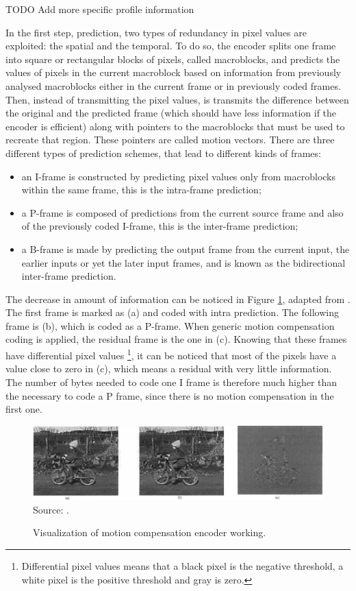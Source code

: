 \documentclass[
	12pt,				%
	openright,			%
	twoside,			%
	a4paper,			%
	brazil,
	french,				%
	english
	]{abntex2}
\begin{document}
TODO Add more specific profile information

In the first step, prediction, two types of redundancy in pixel values are exploited: the spatial and the temporal. To do so, the encoder splits one frame into square or rectangular blocks of pixels, called macroblocks, and predicts the values of pixels in the current macroblock based on information from previously analysed macroblocks either in the current frame or in previously coded frames. Then, instead of transmitting the pixel values, is transmits the difference between the original and the predicted frame (which should have less information if the encoder is efficient) along with pointers to the macroblocks that must be used to recreate that region. These pointers are called motion vectors. There are three different types of prediction schemes, that lead to different kinds of frames:

\begin{itemize}
\item{an I-frame is constructed by predicting pixel values only from macroblocks within the same frame, this is the intra-frame prediction;}
\item{a P-frame is composed of predictions from the current source frame and also of the previously coded I-frame, this is the inter-frame prediction;}
\item{a B-frame is made by predicting the output frame from the current input, the earlier inputs or yet the later input frames, and is known as the bidirectional inter-frame prediction.}
\end{itemize}

The decrease in amount of information can be noticed in Figure \ref{fig:motion_compensation}, adapted from \cite{richardson}. The first frame is marked as (a) and coded with intra prediction. The following frame is (b), which is coded as a P-frame. When generic motion compensation coding is applied, the residual frame is the one in (c). Knowing that these frames have differential pixel values \footnote{Differential pixel values means that a black pixel is the negative threshold, a white pixel is the positive threshold and gray is zero.}, it can be noticed that most of the pixels have a value close to zero in (c), which means a residual with very little information. The number of bytes needed to code one I frame is therefore much higher than the necessary to code a P frame, since there is no motion compensation in the first one.

\begin{figure}
\centering
\caption{Visualization of motion compensation encoder working.}
\includegraphics[width=1\linewidth]{figuras/motion_compensation.png}
\\Source: \cite{richardson}.
\label{fig:motion_compensation}
\end{figure}
\end{document}
